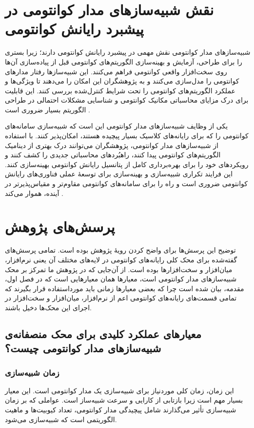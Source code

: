 \section{نقش شبیه‌سازهای مدار کوانتومی در پیشبرد رایانش کوانتومی}
شبیه‌سازهای مدار کوانتومی نقش مهمی در پیشبرد رایانش کوانتومی دارند؛ زیرا بستری را برای طراحی، آزمایش و بهینه‌سازی الگوریتم‌های کوانتومی قبل از پیاده‌سازی آن‌ها روی سخت‌افزار واقعی کوانتومی فراهم می‌کنند. این شبیه‌سازها رفتار مدارهای کوانتومی را مدل‌سازی می‌کنند و به پژوهشگران این امکان را می‌دهند تا ویژگی‌ها و عملکرد الگوریتم‌های کوانتومی را تحت شرایط کنترل‌شده بررسی کنند. این قابلیت برای درک مزایای محاسباتی مکانیک کوانتومی و شناسایی مشکلات احتمالی در طراحی الگوریتم بسیار ضروری است \cite{nielsen_quantum_2010}.

یکی از وظایف شبیه‌سازهای مدار کوانتومی این است که شبیه‌سازی سامانه‌های کوانتومی را که برای رایانه‌های کلاسیک بسیار پیچیده هستند، امکان‌پذیر کنند. با استفاده از شبیه‌سازهای مدار کوانتومی، پژوهشگران می‌توانند درک بهتری از دینامیک الگوریتم‌های کوانتومی پیدا کنند، راهبُردهای محاسباتی جدیدی را کشف کنند و رویکردهای خود را برای بهره‌برداری کامل از پتانسیل رایانش کوانتومی بهینه‌سازی کنند. این فرایند تکراری شبیه‌سازی و بهینه‌سازی برای توسعهٔ عملی فناوری‌های رایانش کوانتومی ضروری است و راه را برای سامانه‌های کوانتومی مقاوم‌تر و مقیاس‌پذیرتر در آینده، هموار می‌کند \cite{nielsen_quantum_2010}.
\section{پرسش‌های پژوهش}
توضیح این پرسش‌ها برای واضح کردن رویهٔ پژوهش بوده است. تمامی پرسش‌های گفته‌شده برای محک کلی رایانه‌های کوانتومی در لایه‌های مختلف آن یعنی نرم‌افزار، میان‌افزار و سخت‌افزارها بوده است. از آن‌جایی که در پژوهش ما تمرکز بر محک شبیه‌سازهای مدار کوانتومی است، معیارها همان معیارهایی است که در فصل اول، مقدمه، بیان شده است چرا که بعضی معیارها زمانی باید مورداستفاده قرار بگیرند که تمامی قسمت‌های رایانه‌های کوانتومی اعم از نرم‌افزار، میان‌افزار و سخت‌افزار در اجرای این محک‌ها دخیل باشند.

\subsection*{معیارهای عملکرد کلیدی برای محک منصفانه‌ی شبیه‌سازهای مدار کوانتومی چیست؟}

\subsubsection{زمان شبیه‌سازی}
این زمان، زمان کلی موردنیاز برای شبیه‌سازی یک مدار کوانتومی است. این معیار بسیار مهم است زیرا بازتابی از کارایی و سرعت شبیه‌ساز است. عواملی که بر زمان شبیه‌سازی تأثیر می‌گذارند شامل پیچیدگی مدار کوانتومی، تعداد کیوبیت‌ها و ماهیت الگوریتمی است که شبیه‌سازی می‌شود\cite{lubinski_application-oriented_2023, jamadagni_benchmarking_2024}.

